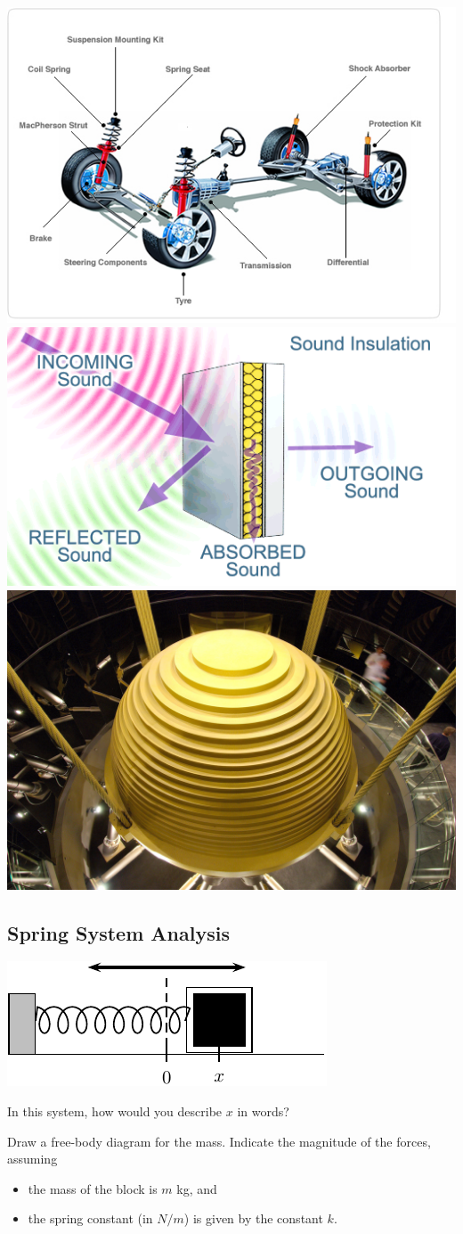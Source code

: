 \begin{center}
\includegraphics[width=0.30\linewidth]{graphics/notes_08_SpringSystemCar}
\includegraphics[width=0.30\linewidth]{graphics/notes_08_Sound-Attenuation} \\
\includegraphics[width=0.30\linewidth]{graphics/notes_08_Tuned_Mass_Damper_atop_Taipei_101_-_27_March_2008}
\end{center}

\newpage

\subsection*{Spring System Analysis}

\begin{center}
\includegraphics[width=0.5\linewidth]{graphics/notes_08_block}
\end{center}

In this system, how would you describe $x$ in words?

\newpage
\problem Draw a free-body diagram for the mass.  Indicate the magnitude of the forces, assuming 
\begin{itemize}
\item the mass of the block is $m$ kg, and
\item the spring constant (in $N/m$) is
  given by the constant $k$.
\end{itemize}

